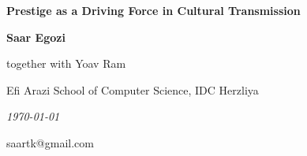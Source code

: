 \documentclass[11pt]{article}
\author{
	Dr. Yoav Ram
	\and
	Saar Egozi
}
\begin{document}
\begin{titlepage}
\centering

\vspace{4cm}

{\LARGE\bfseries Prestige as a Driving Force in Cultural Transmission}

\vspace{2cm}

{\large\bfseries Saar Egozi}

\vspace{1cm}

{\large together with Yoav Ram}

\vspace{2cm}

\vfill

{\large Efi Arazi School of Computer Science, IDC Herzliya}

\vspace{1cm}

{\itshape \today}

{\large saartk@gmail.com}
\end{titlepage}


\renewcommand\linenumberfont{\normalfont\small\sffamily}
\linenumbers
\modulolinenumbers[2]
\setcounter{secnumdepth}{0}
\tableofcontents

\clearpage
\end{document}
